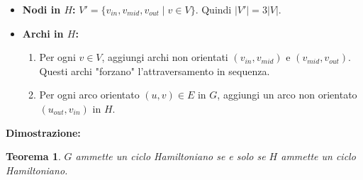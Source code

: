 \documentclass[a4paper, 11pt]{book} %
\newtheorem{theorem}{Teorema}[section]
\theoremstyle{definition}
\begin{document}
\begin{itemize}
    \item \textbf{Nodi in $H$:} $V' = \{v_{in}, v_{mid}, v_{out} \mid v \in V\}$. Quindi $|V'| = 3|V|$.
    \item \textbf{Archi in $H$:}
    \begin{enumerate}
        \item Per ogni $v \in V$, aggiungi archi non orientati $(v_{in}, v_{mid})$ e $(v_{mid}, v_{out})$. Questi archi "forzano" l'attraversamento in sequenza.
        \item Per ogni arco orientato $(u, v) \in E$ in $G$, aggiungi un arco non orientato $(u_{out}, v_{in})$ in $H$.
    \end{enumerate}
\end{itemize}

\textbf{Dimostrazione:}
\begin{theorem}
$G$ ammette un ciclo Hamiltoniano se e solo se $H$ ammette un ciclo Hamiltoniano.
\end{theorem}
\end{document}
